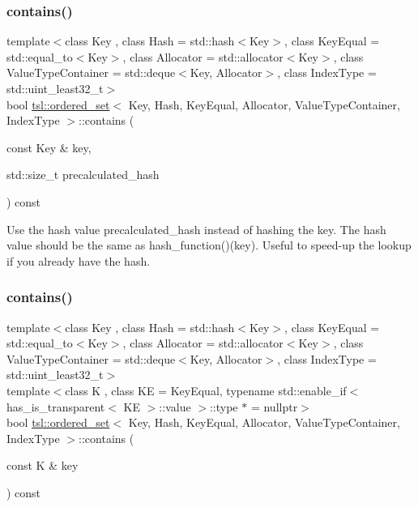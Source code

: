 \subsubsection{\texorpdfstring{contains()}{contains()}\hspace{0.1cm}{\footnotesize\ttfamily [1/3]}}
{\footnotesize\ttfamily template$<$class Key , class Hash  = std\+::hash$<$\+Key$>$, class Key\+Equal  = std\+::equal\+\_\+to$<$\+Key$>$, class Allocator  = std\+::allocator$<$\+Key$>$, class Value\+Type\+Container  = std\+::deque$<$\+Key, Allocator$>$, class Index\+Type  = std\+::uint\+\_\+least32\+\_\+t$>$ \\
bool \mbox{\hyperlink{classtsl_1_1ordered__set}{tsl\+::ordered\+\_\+set}}$<$ Key, Hash, Key\+Equal, Allocator, Value\+Type\+Container, Index\+Type $>$\+::contains (\begin{DoxyParamCaption}\item[{const Key \&}]{key,  }\item[{std\+::size\+\_\+t}]{precalculated\+\_\+hash }\end{DoxyParamCaption}) const\hspace{0.3cm}{\ttfamily [inline]}}

Use the hash value \textquotesingle{}precalculated\+\_\+hash\textquotesingle{} instead of hashing the key. The hash value should be the same as hash\+\_\+function()(key). Useful to speed-\/up the lookup if you already have the hash. \mbox{\label{classtsl_1_1ordered__set_a90f5653e37108274b91d34666a9ef7a9}} 
\subsubsection{\texorpdfstring{contains()}{contains()}\hspace{0.1cm}{\footnotesize\ttfamily [2/3]}}
{\footnotesize\ttfamily template$<$class Key , class Hash  = std\+::hash$<$\+Key$>$, class Key\+Equal  = std\+::equal\+\_\+to$<$\+Key$>$, class Allocator  = std\+::allocator$<$\+Key$>$, class Value\+Type\+Container  = std\+::deque$<$\+Key, Allocator$>$, class Index\+Type  = std\+::uint\+\_\+least32\+\_\+t$>$ \\
template$<$class K , class KE  = Key\+Equal, typename std\+::enable\+\_\+if$<$ has\+\_\+is\+\_\+transparent$<$ K\+E $>$\+::value $>$\+::type $\ast$  = nullptr$>$ \\
bool \mbox{\hyperlink{classtsl_1_1ordered__set}{tsl\+::ordered\+\_\+set}}$<$ Key, Hash, Key\+Equal, Allocator, Value\+Type\+Container, Index\+Type $>$\+::contains (\begin{DoxyParamCaption}\item[{const K \&}]{key }\end{DoxyParamCaption}) const\hspace{0.3cm}{\ttfamily [inline]}}

